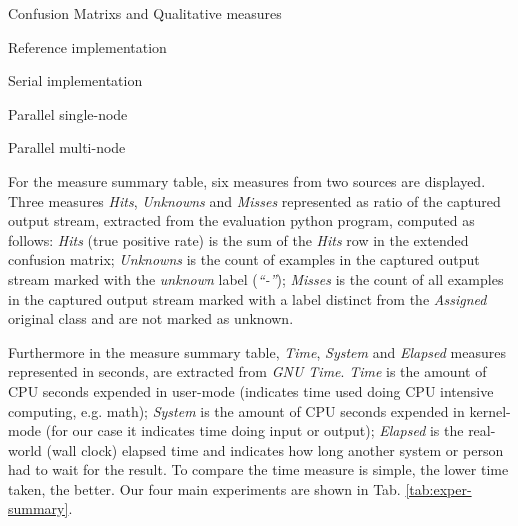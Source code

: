 \begin{table}[htb]
\caption{Confusion Matrixs and Qualitative measures}
\label{tab:confusion-matrixes-ref-serial}
\begin{subtable}[h]{\textwidth}\begin{center}
    \caption{Reference implementation}
    
    \label{tab:java-matrix}
\end{center}\end{subtable}
\begin{subtable}[h]{\textwidth}\begin{center}
    \whencolumns{}{\vspace{5mm}}
    \caption{Serial implementation}
    
    \label{tab:libc-matrix}
    \whencolumns{}{\vspace{5mm}}
\end{center}\end{subtable}
\begin{subtable}[h]{0.5\textwidth}\begin{center}
  \caption{Parallel single-node}
  
  \label{tab:single-node-matrix}
\end{center}\end{subtable}
\begin{subtable}[h]{0.5\textwidth}\begin{center}
  \caption{Parallel multi-node}
  
  \label{tab:multi-node-matrix}
\end{center}\end{subtable}
\end{table}

For the measure summary table, six measures from two sources are displayed. Three
measures \emph{Hits}, \emph{Unknowns} and \emph{Misses} represented as ratio of
the captured output stream, extracted from the evaluation python program,
computed as follows:
\emph{Hits} (true positive rate) is the sum of the \emph{Hits} row in the
extended confusion matrix;
\emph{Unknowns} is the count of examples in the captured output stream marked
with the \emph{unknown} label (\emph{``-''});
\emph{Misses} is the count of all examples in the captured output stream marked
with a label distinct from the \emph{Assigned} original class and are not marked
as unknown.

Furthermore in the measure summary table, \emph{Time}, \emph{System} and \emph{Elapsed}
measures represented in seconds, are extracted from \emph{GNU Time}.
\emph{Time} is the amount of CPU seconds expended in user-mode
(indicates time used doing CPU intensive computing, e.g. math);
\emph{System} is the amount of CPU seconds expended in kernel-mode
(for our case it indicates time doing input or output);
\emph{Elapsed} is the real-world (wall clock) elapsed time and
indicates how long another system or person had to wait for the result.
To compare the time measure is simple, the lower time taken, the better.
Our four main experiments are shown in Tab. \ref{tab:exper-summary}.

